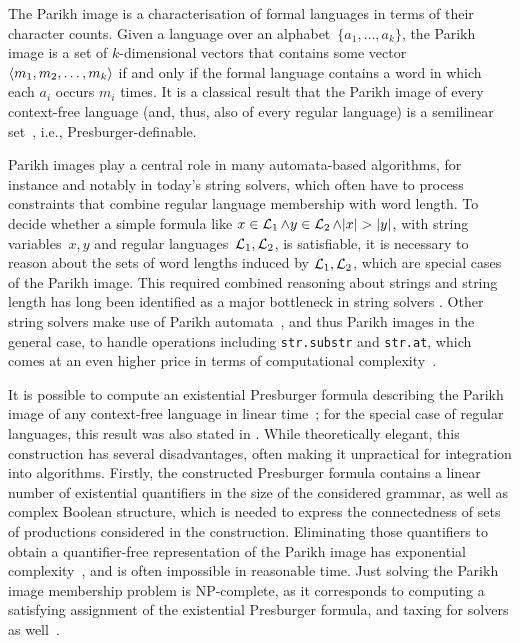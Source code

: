 The Parikh image is a characterisation of formal languages in terms of their
character counts. Given a language over an alphabet~$\{a_1, \ldots, a_k\}$, the
Parikh image is a set of $k$-dimensional vectors that contains some
vector~$\left\langle m_1, m_2, \ldots, m_k\right\rangle$ if and only if the formal
language contains a word in which each $a_i$ occurs $m_i$ times. It is a
classical result that the Parikh image of every context-free language (and,
thus, also of every regular language) is a semilinear set~\cite{parikh-theorem},
i.e., Presburger-definable.

Parikh images play a central role in many automata-based algorithms, for
instance and notably in today's string solvers, which often have to process
constraints that combine regular language membership with word length. To decide
whether a simple formula like $x \in \operatorname{\mathcal{L}}_1 \wedge y \in \operatorname{\mathcal{L}}_2 \wedge
|x| > |y|$, with string variables~$x, y$ and regular languages~$\operatorname{\mathcal{L}}_1,
\operatorname{\mathcal{L}}_2$, is satisfiable, it is necessary to reason about the sets of word
lengths induced by $\operatorname{\mathcal{L}}_1, \operatorname{\mathcal{L}}_2$, which are special cases of the
Parikh image.  This required combined reasoning about strings and string length
has long been identified as a major bottleneck in string solvers
\cite{DBLP:conf/cav/AbdullaACHRRS15,length-aware-solver,approximate-parikh,DBLP:journals/corr/BerzishZG17}.
Other string solvers make use of Parikh automata~\cite{parikh-automata}, and
thus Parikh images in the general case, to handle operations including
\verb!str.substr!  and \verb!str.at!, which comes at an even higher price in
terms of computational complexity~\cite{ostrich-plus}.


It is possible to compute an existential Presburger formula describing the
Parikh image of any context-free language in linear
time~\cite{generate-parikh-image}; for the special case of regular languages,
this result was also stated in \cite{muscholl-linear}. While theoretically
elegant, this construction has several disadvantages, often making it
unpractical for integration into algorithms. Firstly, the constructed Presburger
formula contains a linear number of existential quantifiers in the size of the
considered grammar, as well as complex Boolean structure, which is needed to
express the connectedness of sets of productions considered in the construction.
Eliminating those quantifiers to obtain a quantifier-free representation of the
Parikh image has exponential complexity~\cite{DBLP:conf/issac/Weispfenning97},
and is often impossible in reasonable time. Just solving the Parikh image
membership problem is NP-complete, as it corresponds to computing a satisfying
assignment of the existential Presburger formula, and taxing for solvers as
well~\cite{ostrich-plus}.

